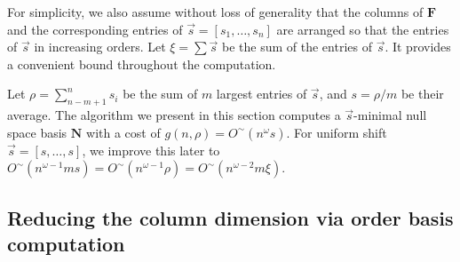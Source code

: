 For simplicity, we also assume without loss of generality that the
columns of $\mathbf{F}$ and the corresponding entries of $\vec{s}=\left[s_{1},\dots,s_{n}\right]$
are arranged so that the entries of $\vec{s}$ in increasing orders.
Let $\xi=\sum\vec{s}$ be the sum of the entries of $\vec{s}$. It
provides a convenient bound throughout the computation.%
\begin{comment}
 The algorithm we present in this section computes a $\vec{s}$-minimal
null space basis $\mathbf{N}$ with a cost of $h(n,\xi)=O^{\sim}(n^{\omega-1}\xi)$.
\end{comment}
{} Let $\rho=\sum_{n-m+1}^{n}s_{i}$ be the sum of $m$ largest entries
of $\vec{s}$, and $s=\rho/m$ be their average. The algorithm we
present in this section computes a $\vec{s}$-minimal null space basis
$\mathbf{N}$ with a cost of $g(n,\rho)=O^{\sim}(n^{\omega}s)$. For
uniform shift $\vec{s}=\left[s,\dots,s\right]$, we improve this later
to $O^{\sim}\left(n^{\omega-1}ms\right)=O^{\sim}\left(n^{\omega-1}\rho\right)=O^{\sim}\left(n^{\omega-2}m\xi\right)$.
\begin{comment}
For general unbalanced shifts, the cost improvement requires the ability
to efficiently compute order basis with general shifts.
\end{comment}


\begin{comment}
Let us first assume $m\le n\le3m$. Let $s=\xi/n$ be the average
of the entries of $\vec{s}$. 
\end{comment}
{} 


\subsection{\label{sub:continueComputingNullspaceBasisByColumns}Reducing the
column dimension via order basis computation}

